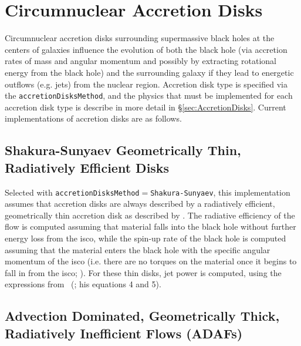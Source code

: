 \section{Circumnuclear Accretion Disks}\label{sec:CircumnuclearDisks}

Circumnuclear accretion disks surrounding supermassive black holes at the centers of galaxies influence the evolution of both the black hole (via accretion rates of mass and angular momentum and possibly by extracting rotational energy from the black hole) and the surrounding galaxy if they lead to energetic outflows (e.g. jets) from the nuclear region. Accretion disk type is specified via the {\tt accretionDisksMethod}, and the physics that must be implemented for each accretion disk type is describe in more detail in \S\ref{sec:AccretionDisks}. Current implementations of accretion disks are as follows.

\subsection{Shakura-Sunyaev Geometrically Thin, Radiatively Efficient Disks}

Selected with {\tt accretionDisksMethod}$=${\tt Shakura-Sunyaev}, this implementation assumes that accretion disks are always described by a radiatively efficient, geometrically thin accretion disk as described by \cite{shakura_black_1973}. The radiative efficiency of the flow is computed assuming that material falls into the black hole without further energy loss from the \gls{isco}, while the spin-up rate of the black hole is computed assuming that the material enters the black hole with the specific angular momentum of the \gls{isco} (i.e. there are no torques on the material once it begins to fall in from the \gls{isco}; \citealt{bardeen_kerr_1970}). For these thin disks, jet power is computed, using the expressions from \citeauthor{meier_association_2001}~(\citeyear{meier_association_2001}; his equations 4 and 5).

\subsection{Advection Dominated, Geometrically Thick, Radiatively Inefficient Flows (ADAFs)}

